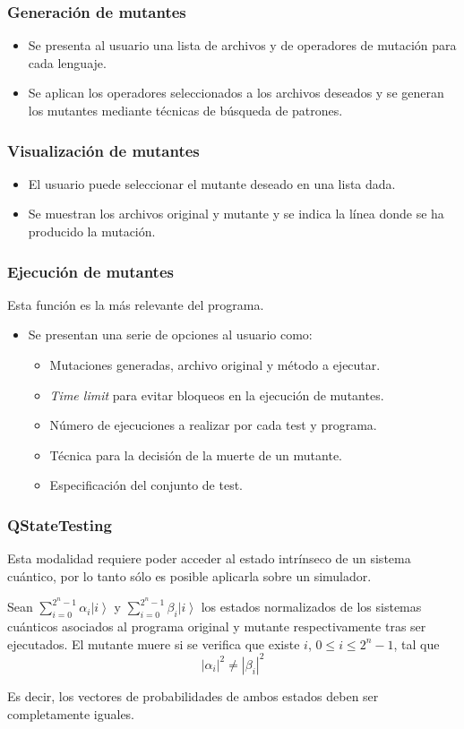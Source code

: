 \documentclass{beamer}
\newcommand{\ket}[1]{\left|#1\right\rangle}
\begin{document}
\begin{frame}
	\frametitle{Generación de mutantes}
	\begin{itemize}
		\item Se presenta al usuario una lista de archivos y de operadores de mutación para cada lenguaje.
		\item Se aplican los operadores seleccionados a los archivos deseados y se generan los mutantes mediante técnicas de búsqueda de patrones.
	\end{itemize}
\end{frame}

\begin{frame}
	\frametitle{Visualización de mutantes}
	\begin{itemize}
		\item El usuario puede seleccionar el mutante deseado en una lista dada.
		\item Se muestran los archivos original y mutante y se indica la línea donde se ha producido la mutación.
	\end{itemize}
\end{frame}

\begin{frame}
	\frametitle{Ejecución de mutantes}
	Esta función es la más relevante del programa. 
	\begin{itemize}
		\item Se presentan una serie de opciones al usuario como:
		\begin{itemize}
		\item Mutaciones generadas, archivo original y método a ejecutar.
		\item \textit{Time limit} para evitar bloqueos en la ejecución de mutantes.
		\item Número de ejecuciones a realizar por cada test y programa.
		\item Técnica para la decisión de la muerte de un mutante.
		\item Especificación del conjunto de test.
		\end{itemize}
	\end{itemize}
\end{frame}


\begin{frame}
	\frametitle{QStateTesting}
	
	Esta modalidad requiere poder acceder al estado intrínseco de un sistema cuántico, por lo tanto sólo es posible aplicarla sobre un simulador.
	
	Sean $\sum_{i=0}^{2^n-1}\alpha_i\ket{i}$ y $\sum_{i=0}^{2^n-1}\beta_i\ket{i}$ los estados normalizados de los sistemas cuánticos asociados al programa original y mutante respectivamente tras ser ejecutados. El mutante muere si se verifica que existe $i$, $0\leq i\leq 2^n-1$, tal que
	\[|\alpha_i|^2\neq|\beta_i|^2\]
	
	Es decir, los vectores de probabilidades de ambos estados deben ser completamente iguales.
\end{frame}
\end{document}
